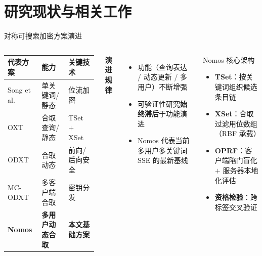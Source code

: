 \section{研究现状与相关工作}

\begin{frame}{对称可搜索加密方案演进}

  \begin{columns}[T]
      \begin{tabular}{lll}
        \toprule
        \textbf{代表方案} & \textbf{能力} & \textbf{关键技术} \\
        \midrule
        Song et al. & 单关键词/静态 & 位流加密 \\
        OXT & 合取查询/静态 & TSet $+$ XSet \\
        ODXT & 合取动态 & 前向/后向安全 \\
        MC-ODXT & 多客户端合取 & 密钥分发 \\
        \textbf{Nomos} & \textbf{多用户动态合取} & \textbf{本文基础方案} \\
        \bottomrule
      \end{tabular}

      \vspace{0.8em}
      \textbf{演进规律}
      \begin{itemize}
        \item 功能（查询表达 / 动态更新 / 多用户）不断增强
        \item 可验证性研究\textbf{始终滞后}于功能演进
        \item Nomos 代表当前多用户多关键词 SSE 的最新基线
      \end{itemize}

      \begin{block}{Nomos 核心架构}
        \small
        \begin{itemize}
          \item \textbf{TSet}：按关键词组织候选条目链
          \item \textbf{XSet}：合取过滤用位数组（RBF 承载）
          \item \textbf{OPRF}：客户端陷门盲化 $+$ 服务器本地化评估
          \item \textbf{资格检验}：跨标签交叉验证
        \end{itemize}
      \end{block}
  \end{columns}

\end{frame}

